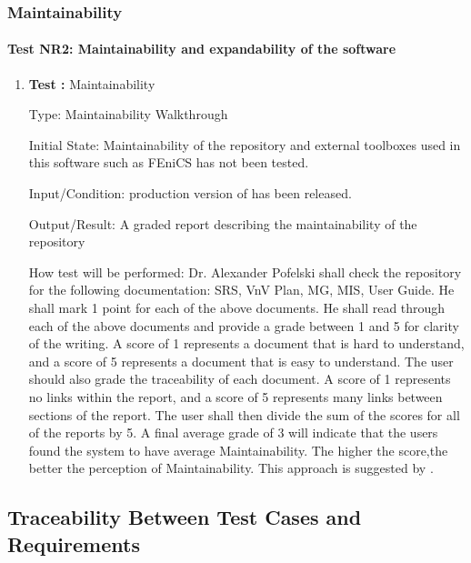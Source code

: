 \documentclass[12pt, titlepage]{article}
\begin{document}
\subsubsection{Maintainability}

\paragraph{Test NR2: Maintainability and expandability of the software}

\begin{enumerate}
	
	\item{\textbf{Test :} Maintainability\\}
	
	Type: Maintainability Walkthrough
	
	Initial State: Maintainability of the repository and external toolboxes used in this software such as FEniCS has not been tested.
	
	Input/Condition: production version of \progname{} has been released.
	
	Output/Result: A graded report describing the maintainability of the repository
	
	How test will be performed: Dr. Alexander Pofelski shall check the repository for the following documentation:  SRS, VnV Plan, MG, MIS, User Guide. He shall mark 1 point for each of the above documents. He shall read through each of the above documents and
	provide a grade between 1 and 5 for clarity of the writing. A score of 1 represents a document that is hard to understand, and a score of 5 represents a document that is easy to understand. The user should also grade the traceability of each document. A score of 1 represents no links within the report, and a score of 5 represents many links between sections of the report. The user shall then divide the sum of the scores for all of the reports by 5.
	 A final average grade of 3 will indicate that the users found the system to have average Maintainability. The higher the score,the better the perception of Maintainability. This approach is suggested by \cite{LatticeB41:online}. 
					
\end{enumerate}

\subsection{Traceability Between Test Cases and Requirements}
\end{document}
